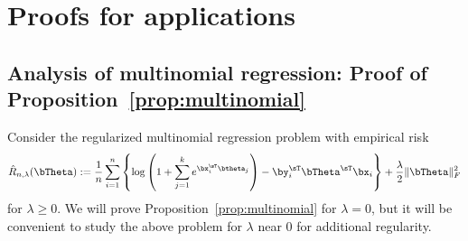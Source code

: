 \section{Proofs for applications}
\subsection{Analysis of multinomial regression: Proof of Proposition~\ref{prop:multinomial}}
   Consider the regularized multinomial regression problem with empirical risk
   \begin{equation}
       \hat R_{n,\lambda}(\bTheta) := \frac1n\sum_{i=1}^n \left\{ \log\left(1 + \sum_{j=1}^k e^{\bx_i^\sT\btheta_j}\right) - \by_i^\sT\bTheta^{\sT}\bx_i \right\}  + \frac{\lambda}{2} \|\bTheta\|_F^2
   \end{equation}
   for $\lambda \ge 0$. We will prove Proposition~\ref{prop:multinomial}
   for $\lambda =0$, but it will be convenient to study the above problem for $\lambda$ near $0$ for additional regularity.


